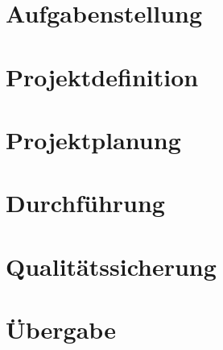 


%
%

\begin{singlespace}
	\tableofcontents{}	\pagebreak
\end{singlespace}

\pagestyle{scrheadings} 	%
\setcounter{page}{1}
\section{Aufgabenstellung}

\pagebreak
\section{Projektdefinition}

\section{Projektplanung}

\section{Durchführung}

\section{Qualitätssicherung}

\section{Übergabe}



\pagebreak
\printbibliography
\pagebreak



